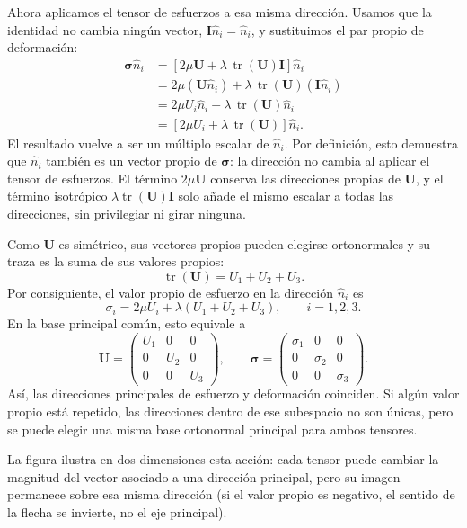 \documentclass[a4paper]{article}
\begin{document}
Ahora aplicamos el tensor de esfuerzos a esa misma dirección. Usamos que la identidad no cambia ningún vector, $\mathbf{I}\hat{n}_i=\hat{n}_i$, y sustituimos el par propio de deformación:
$$
\begin{aligned}
\boldsymbol{\sigma}\hat{n}_i
&=\left[2\mu\mathbf{U}+\lambda\,\operatorname{tr}(\mathbf{U})\mathbf{I}\right]\hat{n}_i\\
&=2\mu\left(\mathbf{U}\hat{n}_i\right)
 +\lambda\,\operatorname{tr}(\mathbf{U})\left(\mathbf{I}\hat{n}_i\right)\\
&=2\mu U_i\hat{n}_i
 +\lambda\,\operatorname{tr}(\mathbf{U})\hat{n}_i\\
&=\left[2\mu U_i+\lambda\,\operatorname{tr}(\mathbf{U})\right]\hat{n}_i.
\end{aligned}
$$
El resultado vuelve a ser un múltiplo escalar de $\hat{n}_i$. Por definición, esto demuestra que $\hat{n}_i$ también es un vector propio de $\boldsymbol{\sigma}$: la dirección no cambia al aplicar el tensor de esfuerzos. El término $2\mu\mathbf U$ conserva las direcciones propias de $\mathbf U$, y el término isotrópico $\lambda\operatorname{tr}(\mathbf U)\mathbf I$ solo añade el mismo escalar a todas las direcciones, sin privilegiar ni girar ninguna.

Como $\mathbf U$ es simétrico, sus vectores propios pueden elegirse ortonormales y su traza es la suma de sus valores propios:
$$
\operatorname{tr}(\mathbf U)=U_1+U_2+U_3.
$$
Por consiguiente, el valor propio de esfuerzo en la dirección $\hat n_i$ es
$$
\boxed{\sigma_i=2\mu U_i+\lambda(U_1+U_2+U_3)},
\qquad i=1,2,3.
$$
En la base principal común, esto equivale a
$$
\mathbf U=\begin{pmatrix}U_1&0&0\\0&U_2&0\\0&0&U_3\end{pmatrix},
\qquad
\boldsymbol{\sigma}=\begin{pmatrix}\sigma_1&0&0\\0&\sigma_2&0\\0&0&\sigma_3\end{pmatrix}.
$$
Así, las direcciones principales de esfuerzo y deformación coinciden. Si algún valor propio está repetido, las direcciones dentro de ese subespacio no son únicas, pero se puede elegir una misma base ortonormal principal para ambos tensores.

La figura ilustra en dos dimensiones esta acción: cada tensor puede cambiar la magnitud del vector asociado a una dirección principal, pero su imagen permanece sobre esa misma dirección (si el valor propio es negativo, el sentido de la flecha se invierte, no el eje principal).

\end{document}
